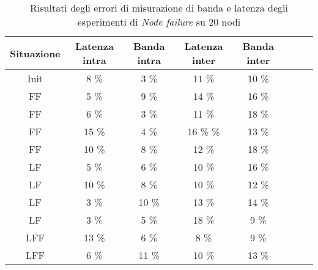     \begin{table}[H]
    \caption{Risultati degli errori di misurazione di banda e latenza degli esperimenti di \textit{Node failure} su 20 nodi}
    \label{tab:nodefail20qos2}
    \begin{center}
        \begin{tabular}{|c|c|c|c|c|c|c|c|}
            \hline
            Situazione & Latenza intra & Banda intra & Latenza inter & Banda inter\\
            \hline
            Init & 8 \%   & 3 \%   & 11 \%  & 10 \%   \\
            FF    & 5 \%   & 9 \%   & 14 \%  & 16 \%   \\
            FF    & 6 \%   & 3 \%   & 11 \%  & 18 \%   \\
            FF    & 15 \%  & 4 \%   & 16 \%  \%  & 13 \%   \\
            FF    & 10 \%  & 8 \%   & 12 \%  & 18 \%   \\
            LF    & 5 \%   & 6 \%   & 10 \%  & 16 \%   \\
            LF    & 10 \%  & 8 \%   & 10 \%  & 12 \%   \\
            LF    & 3 \%   & 10 \%  & 13 \%  & 14 \%   \\
            LF    & 3 \%   & 5 \%   & 18 \%  & 9 \%    \\
            LFF    & 13 \%  & 6 \%   & 8 \%   & 9 \%    \\
            LFF   & 6 \%   & 11 \%  & 10 \%  & 13 \%   \\
            \hline
        \end{tabular}
        \end{center}
    \end{table}
        
